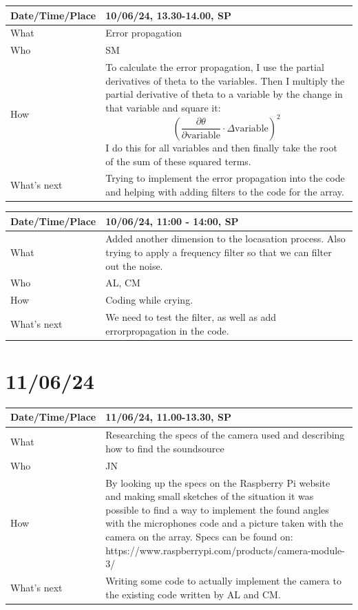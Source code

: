 \documentclass{article}
\begin{document}
\begin{table}[H]
\begin{tabular}{|p{1.5in}|p{4in}|}
\hline
Date/Time/Place &  10/06/24, 13.30-14.00, SP\\ \hline
What            &  Error propagation\\ \hline
Who             &  SM\\ \hline
How             &   To calculate the error propagation, I use the partial derivatives of theta to the variables. Then I multiply the partial derivative of theta to a variable by the change in that variable and square it: $$(\frac{\partial\theta}{\partial \text{variable}}\cdot\Delta\text{variable})^2$$ I do this for all variables and then finally take the root of the sum of these squared terms.\\ 
\hline 
What's next     &  Trying to implement the error propagation into the code and helping with adding filters to the code for the array. \hline
\end{tabular}
\end{table}

\begin{table}[H]
\begin{tabular}{|p{1.5in}|p{4in}|}
\hline
Date/Time/Place &  10/06/24, 11:00 - 14:00, SP\\ \hline
What            &  Added another dimension to the locasation process. Also trying to apply a frequency filter so that we can filter out the noise.\\ \hline
Who             &  AL, CM\\ \hline
How             &  Coding while crying.\\ \hline
What's next     &  We need to test the filter, as well as add errorpropagation in the code.\\ \hline
\end{tabular}
\end{table}

\section{11/06/24}

\begin{table}[H]
\begin{tabular}{|p{1.5in}|p{4in}|}
\hline
Date/Time/Place &  11/06/24, 11.00-13.30, SP\\ \hline
What            &  Researching the specs of the camera used and describing how to find the soundsource\\ \hline
Who             &  JN\\ \hline
How             &  By looking up the specs on the Raspberry Pi website and making small sketches of the situation it was possible to find a way to implement the found angles with the microphones code and a picture taken with the camera on the array. Specs can be found on: https://www.raspberrypi.com/products/camera-module-3/ \\ \hline
What's next     &  Writing some code to actually implement the camera to the existing code written by AL and CM.\\ \hline
\end{tabular}
\end{table}
\end{document}
